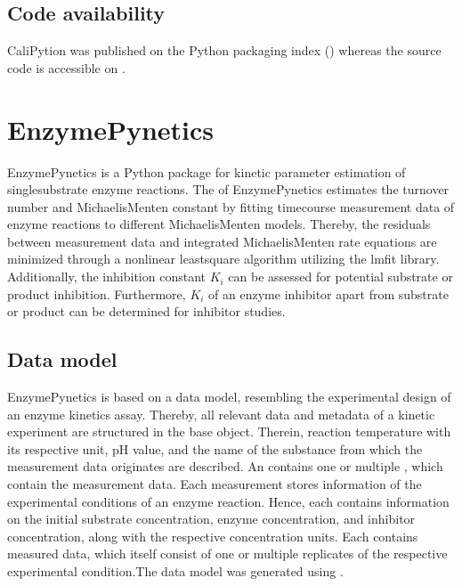\documentclass[letterpaper,12pt,english]{jupyterBook}
\begin{document}
\subsection{Code availability}
\label{\detokenize{methods:code-availability}}
\sphinxAtStartPar
CaliPytion was published on the Python packaging index () whereas the source code is accessible on .


\section{EnzymePynetics}
\label{\detokenize{methods:enzymepynetics}}\label{\detokenize{methods:method-enzymepynetics}}
\sphinxAtStartPar
EnzymePynetics is a Python package for kinetic parameter estimation of single\sphinxhyphen{}substrate enzyme reactions. The  of EnzymePynetics estimates the turnover number and Michaelis\sphinxhyphen{}Menten constant by fitting time\sphinxhyphen{}course measurement data of enzyme reactions to different Michaelis\sphinxhyphen{}Menten models. Thereby, the residuals between measurement data and integrated Michaelis\sphinxhyphen{}Menten rate equations are minimized through a non\sphinxhyphen{}linear least\sphinxhyphen{}square algorithm utilizing the lmfit library. Additionally, the inhibition constant \(K_{i}\) can be assessed for potential substrate or product inhibition. Furthermore, \(K_{i}\) of an enzyme inhibitor apart from substrate or product can be determined for inhibitor studies.


\subsection{Data model}
\label{\detokenize{methods:enzymepynetics-datamodel}}\label{\detokenize{methods:id3}}
\sphinxAtStartPar
EnzymePynetics is based on a data model, resembling the experimental design of an enzyme kinetics assay. Thereby, all relevant data and metadata of a kinetic experiment are structured in the  base object. Therein, reaction temperature with its respective unit, pH value, and the name of the substance from which the measurement data originates are described. An  contains one or multiple , which contain the measurement data. Each measurement stores information of the experimental conditions of an enzyme reaction. Hence, each  contains information on the initial substrate concentration, enzyme concentration, and inhibitor concentration, along with the respective concentration units. Each  contains measured data, which itself consist of one or multiple replicates of the respective experimental condition.The data model was generated using .
\end{document}
